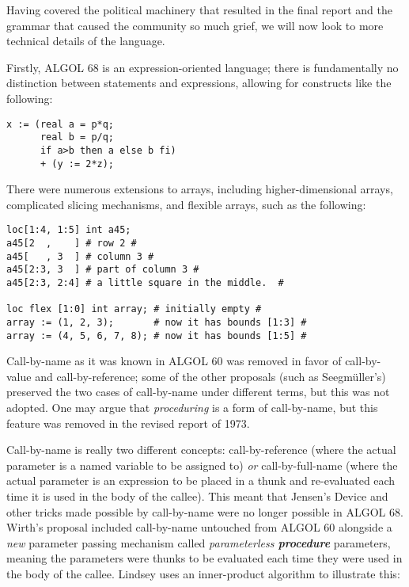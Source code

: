 Having covered the political machinery that resulted in the final report and
the grammar that caused the community so much grief,
we will now look to more technical details of the language.

Firstly, ALGOL 68 is an expression-oriented language;
there is fundamentally no distinction between statements and expressions,
allowing for constructs like the following:

\begin{lstlisting}[language=algol,frame=single]
x := (real a = p*q;
      real b = p/q;
      if a>b then a else b fi)
      + (y := 2*z);
\end{lstlisting}

There were numerous extensions to arrays, including higher-dimensional arrays,
complicated slicing mechanisms, and flexible arrays, such as the following:
\begin{lstlisting}[language=algol,frame=single]
loc[1:4, 1:5] int a45;
a45[2  ,    ] # row 2 #
a45[   , 3  ] # column 3 #
a45[2:3, 3  ] # part of column 3 #
a45[2:3, 2:4] # a little square in the middle.  #

loc flex [1:0] int array; # initially empty #
array := (1, 2, 3);       # now it has bounds [1:3] #
array := (4, 5, 6, 7, 8); # now it has bounds [1:5] #
\end{lstlisting}

Call-by-name as it was known in ALGOL 60 was removed in favor of
call-by-value and call-by-reference; some of the other proposals
(such as Seegm{\"u}ller's) preserved the two cases of call-by-name
under different terms, but this was not adopted.
One may argue that \textit{proceduring} is a form of call-by-name,
but this feature was removed in the revised report of 1973.

Call-by-name is really two different concepts:
call-by-reference (where the actual parameter is a named variable to
be assigned to) \textit{or} call-by-full-name (where the actual parameter
is an expression to be placed in a thunk and re-evaluated each time
it is used in the body of the callee). This meant that Jensen's Device
and other tricks made possible by call-by-name were no longer possible
in ALGOL 68.
Wirth's proposal included call-by-name untouched from ALGOL 60 alongside
a \textit{new} parameter passing mechanism called \textit{parameterless \textbf{procedure}}
parameters, meaning the parameters were thunks to be evaluated each time they
were used in the body of the callee\cite{a_history_of_algol_68_1993}.
Lindsey uses an inner-product algorithm to illustrate this:

